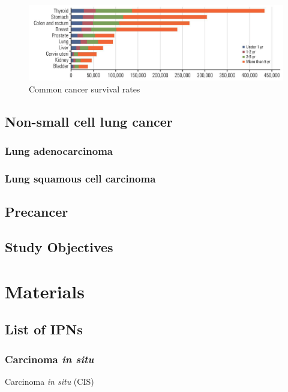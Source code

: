 \documentclass[11pt,a4paper,onecolumn,oneside]{report}
\begin{document}
            \begin{figure}[p]
                \centering
                \includegraphics[width=0.8 \linewidth]{figures/LungCancer/rate.png}
                \caption{Common cancer survival rates \protect\cite{lung6}}
                \label{fig:cancer-survival}
            \end{figure}

        \subsection{Non-small cell lung cancer}

            \subsubsection{Lung adenocarcinoma}

            \subsubsection{Lung squamous cell carcinoma}

        \subsection{Precancer}

        \subsection{Study Objectives}
    \newpage

    \section{Materials}
        \subsection{List of IPNs}
            \subsubsection{Carcinoma \textit{in situ}}
                Carcinoma \textit{in situ} (CIS)
\end{document}
